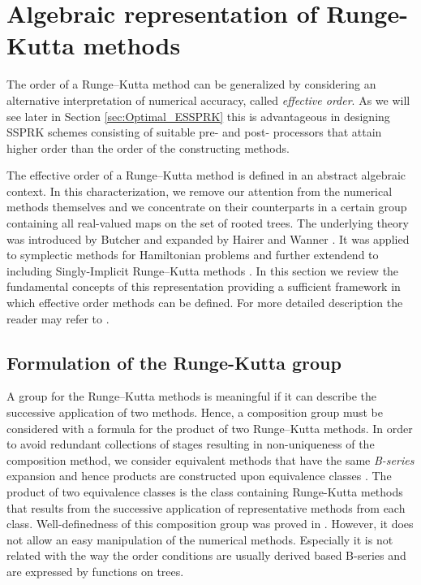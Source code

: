 \section{Algebraic representation of Runge-Kutta methods}\label{sec:Algebraic_RK}

\indent The order of a Runge--Kutta method can be generalized by considering an alternative interpretation of numerical accuracy, called \emph{effective order}. As we will see later in Section \ref{sec:Optimal_ESSPRK} this is advantageous in designing SSPRK schemes consisting of suitable pre- and post- processors that attain higher order than the order of the constructing methods. 

The effective order of a Runge--Kutta method is defined in an abstract algebraic context. In this characterization, we remove our attention from the numerical methods themselves and we concentrate on their counterparts in a certain group containing all real-valued maps on the set of rooted trees. The underlying theory was introduced by Butcher \cite{Butcher1969} and expanded by Hairer and Wanner \cite{Hairer1974}. It was applied to symplectic methods for Hamiltonian problems \cite{Lopez1996} and further extendend to including Singly-Implicit Runge--Kutta methods \cite{Butcher1997, Butcher1999}. In this section we review the fundamental concepts of this representation providing a sufficient framework in which effective order methods can be defined. For more detailed description the reader may refer to \cite{Butcher2008_book, Butcher1972}.

\subsection{Formulation of the Runge-Kutta group}\label{sec:RK_group}

\indent A group for the Runge--Kutta methods is meaningful if it can describe the successive application of two methods. Hence, a composition group must be considered with a formula for the product of two Runge--Kutta methods. In order to avoid redundant collections of stages resulting in non-uniqueness of the composition method, we consider equivalent methods that have the same \emph{B-series} expansion and hence products are constructed upon equivalence classes \cite{Butcher1987_book, Butcher2008_book}. The product of two equivalence classes is the class containing Runge-Kutta methods that results from the successive application of representative methods from each class.  Well-definedness of this composition group was proved in \cite{Butcher1972}. However, it does not allow an easy manipulation of the numerical methods. Especially it is not related with the way the order conditions are usually derived based B-series and are expressed by functions on trees. 

